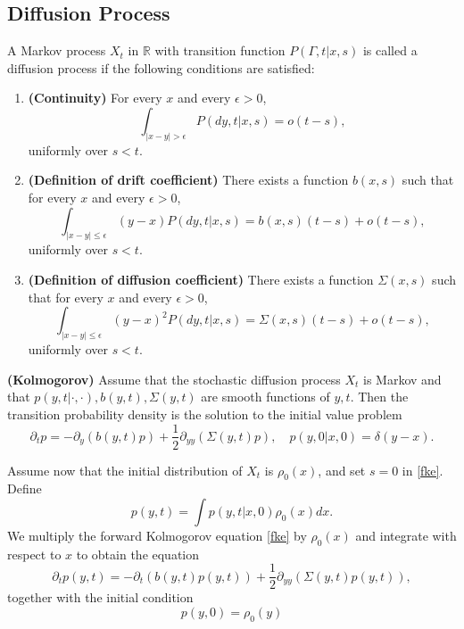 \documentclass{article}
\begin{document}
\subsection*{Diffusion Process}
\begin{definition}
    A Markov process $X_t$ in $\mathbb{R}$ with transition function $P(\Gamma,t|x,s)$ is called a diffusion process if the following conditions are satisfied:
    \begin{enumerate}
        \item \textbf{(Continuity)} For every $x$ and every $\epsilon > 0$,
        \begin{equation}
            \int_{|x-y|>\epsilon} P(dy,t|x,s)=o(t-s),
        \end{equation}
        uniformly over $s < t$.
        \item \textbf{(Definition of drift coefficient)} There exists a function $b(x,s)$ such that for every $x$ and every $\epsilon>0$,
        \begin{equation}
            \int_{|x-y|\leq\epsilon} (y-x)P(dy,t|x,s)=b(x,s)(t-s)+o(t-s),
        \end{equation}        
        uniformly over $s<t$.
        \item \textbf{(Definition of diffusion coefficient)} There exists a function $\Sigma(x,s)$ such that for every $x$ and every $\epsilon>0$,
        \begin{equation}
            \int_{|x-y|\leq \epsilon} (y-x)^2P(dy,t|x,s)=\Sigma(x,s)(t-s)+o(t-s),
        \end{equation}        
        uniformly over $s<t$.      
    \end{enumerate}
\end{definition}
\begin{theorem}\textbf{(Kolmogorov)}
    Assume that the stochastic diffusion process $X_t$ is Markov and that $p(y,t|\cdot,\cdot),b(y,t),\Sigma(y,t)$ are smooth functions of $y,t$. Then the transition probability density is the solution to the initial value problem
    \begin{equation}
        \partial_t p = -\partial_y (b(y,t) p)+\frac{1}{2}\partial_{yy}(\Sigma(y,t)p), \quad p(y,0|x,0)=\delta(y-x).
        \label{fke}
    \end{equation}
\end{theorem}

Assume now that the initial distribution of $X_t$ is $\rho_0(x)$, and set $s=0$ in \eqref{fke}. Define
\begin{equation}
    p(y,t)=\int p(y,t|x,0)\rho_0(x)dx.
    \label{fke density}
\end{equation}
We multiply the forward Kolmogorov equation \eqref{fke} by $\rho_0(x)$ and integrate with respect to $x$ to obtain the equation
\begin{equation}
    \partial_t p(y,t)= -\partial_t (b(y,t) p(y,t))+\frac{1}{2}\partial_{yy} (\Sigma(y,t)p(y,t)),
\end{equation}
together with the initial condition
\begin{equation}
    p(y,0)=\rho_0(y)
\end{equation}
\end{document}
